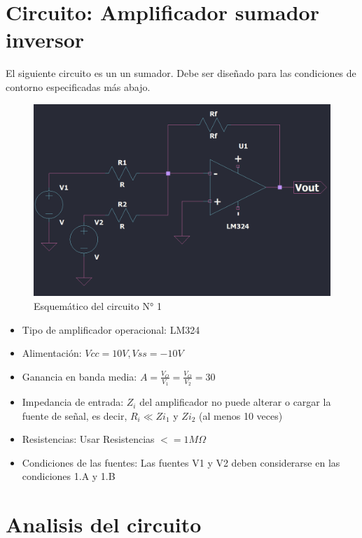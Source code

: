 \section{Circuito: Amplificador sumador inversor}

El siguiente circuito es un un sumador. Debe ser diseñado para las condiciones de contorno especificadas más abajo.

\begin{figure}[h!]
    \centering
    \includegraphics[width=0.90\linewidth]{img/esquematico_complete.png}
    \caption{Esquemático del circuito N° 1}
    \label{fig:esquematico_complete}
\end{figure}

\begin{itemize}
  \item Tipo de amplificador operacional: LM324
  \item Alimentación: $Vcc = 10V, Vss = -10V$
  \item Ganancia en banda media: $A = \frac{V_O}{V_1} = \frac{V_O}{V_2} = 30$
  \item Impedancia de entrada: $Z_i$ del amplificador no puede alterar o cargar la fuente de señal, es decir, $R_i  \ll Zi_1$ y $Zi_2$ (al menos 10 veces)
  
  \item Resistencias: Usar Resistencias $<= 1M \Omega$
  \item Condiciones de las fuentes: Las fuentes V1 y V2 deben considerarse en las condiciones 1.A y 1.B

\end{itemize}





\section{Analisis del circuito}

